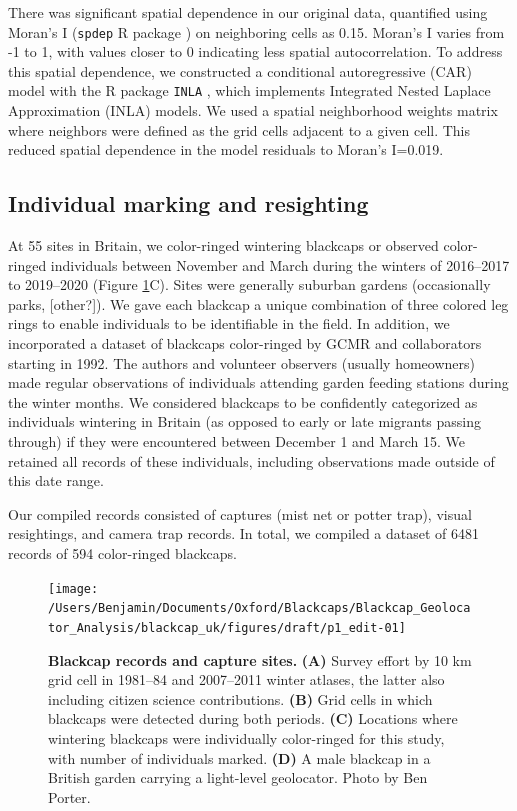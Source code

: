 \documentclass[a4paper, twoside]{templates/ociamthesis}
\begin{document}
There was significant spatial dependence in our original data, quantified using Moran's I (\texttt{spdep} R package \autocite{bivandAppliedSpatialData2013}) on neighboring cells as 0.15. Moran's I varies from -1 to 1, with values closer to 0 indicating less spatial autocorrelation. To address this spatial dependence, we constructed a conditional autoregressive (CAR) model with the R package \texttt{INLA} \autocite{lindgrenBayesianSpatialModelling2015}, which implements Integrated Nested Laplace Approximation (INLA) models. We used a spatial neighborhood weights matrix where neighbors were defined as the grid cells adjacent to a given cell. This reduced spatial dependence in the model residuals to Moran's I=0.019.

\hypertarget{individual-marking-and-resighting}{%
\subsection{Individual marking and resighting}\label{individual-marking-and-resighting}}

At 55 sites in Britain, we color-ringed wintering blackcaps or observed color-ringed individuals between November and March during the winters of 2016--2017 to 2019--2020 (Figure \ref{fig:site-fig}C). Sites were generally suburban gardens (occasionally parks, {[}other?{]}). We gave each blackcap a unique combination of three colored leg rings to enable individuals to be identifiable in the field. In addition, we incorporated a dataset of blackcaps color-ringed by GCMR and collaborators starting in 1992. The authors and volunteer observers (usually homeowners) made regular observations of individuals attending garden feeding stations during the winter months. We considered blackcaps to be confidently categorized as individuals wintering in Britain (as opposed to early or late migrants passing through) if they were encountered between December 1 and March 15. We retained all records of these individuals, including observations made outside of this date range.

Our compiled records consisted of captures (mist net or potter trap), visual resightings, and camera trap records. In total, we compiled a dataset of 6481 records of 594 color-ringed blackcaps.



\begin{figure}
\texttt{[image: /Users/Benjamin/Documents/Oxford/Blackcaps/Blackcap\_Geolocator\_Analysis/blackcap\_uk/figures/draft/p1\_edit-01]} \caption{\textbf{Blackcap records and capture sites.} \textbf{(A)} Survey effort by 10 km grid cell in 1981--84 and 2007--2011 winter atlases, the latter also including citizen science contributions. \textbf{(B)} Grid cells in which blackcaps were detected during both periods. \textbf{(C)} Locations where wintering blackcaps were individually color-ringed for this study, with number of individuals marked. \textbf{(D)} A male blackcap in a British garden carrying a light-level geolocator. Photo by Ben Porter.}\label{fig:site-fig}
\end{figure}
\end{document}
